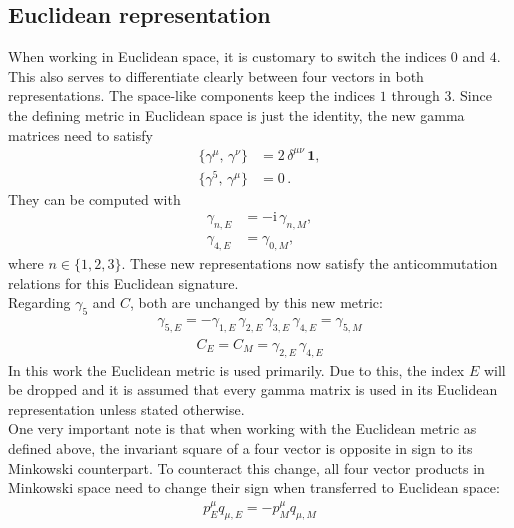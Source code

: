 \documentclass[oneside, openany]{book}
\numberwithin{equation}{chapter}
\numberwithin{figure}{chapter}
\newcommand{\ii}{\mathrm{i}}
\newcommand{\g}[0]{\gamma}
\begin{document}
\subsection{Euclidean representation} \label{sec:euclid}
When working in Euclidean space, it is customary to switch the indices $0$ and $4$. This also serves to differentiate clearly between four vectors in both representations. The space-like components keep the indices $1$ through $3$. Since the defining metric in Euclidean space is just the identity, the new gamma matrices need to satisfy 
\begin{align}
	\{ \g^\mu,\, \g^\nu \} &= 2\,\delta^{\mu\nu} \,\mathbf 1, \\
	\{ \g^5,\, \g^\mu \} &= 0\,.
\end{align}
They can be computed with 
\begin{align}
	\g_{n,E} &= -\ii \,\g_{n,M}, \\
	\g_{4,E} &= \g_{0,M},
\end{align}
where $n \in \{1,2,3\}$. These new representations now satisfy the anticommutation relations for this Euclidean signature. \\
Regarding $\g_5$ and $C$, both are unchanged by this new metric:
\begin{align}
	\g_{5,E} = -\g_{1,E} \, \g_{2,E} \, \g_{3,E} \, \g_{4,E} = \g_{5,M}
\end{align}\vspace*{-0.6cm}
\begin{align}
	C_E = C_M = \g_{2,E} \, \g_{4,E}
\end{align}
In this work the Euclidean metric is used primarily. Due to this, the index $E$ will be dropped and it is assumed that every gamma matrix is used in its Euclidean representation unless stated otherwise. \\
One very important note is that when working with the Euclidean metric as defined above, the invariant square of a four vector is opposite in sign to its Minkowski counterpart. To counteract this change, all four vector products in Minkowski space need to change their sign when transferred to Euclidean space:
\begin{align}
	p_E^\mu q_{\mu,E} = -p_M^\mu q_{\mu,M}
\end{align}
\end{document}
